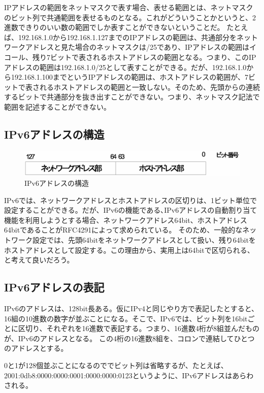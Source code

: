 IPアドレスの範囲をネットマスクで表す場合、表せる範囲とは、ネットマスクのビット列で共通範囲を表せるものとなる。これがどういうことかというと、2進数できりのいい数の範囲でしか表すことができないということだ。
たとえば、192.168.1.0から192.168.1.127までのIPアドレスの範囲は、共通部分をネットワークアドレスと見た場合のネットマスクは/25であり、IPアドレスの範囲はイコール、残り7ビットで表されるホストアドレスの範囲となる。つまり、このIPアドレスの範囲は192.168.1.0/25として表すことができる。だが、192.168.1.0から192.168.1.100までというIPアドレスの範囲は、ホストアドレスの範囲が、7ビットで表されるホストアドレスの範囲と一致しない。そのため、先頭からの連続するビットで共通部分を抜き出すことができない。つまり、ネットマスク記法で範囲を記述することができない。

\subsection{IPv6アドレスの構造}

\begin{figure}[htbp]
	\includegraphics[width=12cm,clip]{draw/ip6addr.eps}
	\caption{IPv6アドレスの構造}
	\label{fig:ipaddr}
\end{figure}


IPv6では、ネットワークアドレスとホストアドレスの区切りは、1ビット単位で設定することができる。だが、IPv6の機能である､IPv6アドレスの自動割り当て機能を利用しようとする場合、ネットワークアドレス64bit、ホストアドレス64bitであることがRFC4291によって求められている。
そのため、一般的なネットワーク設定では、先頭64bitをネットワークアドレスとして扱い、残り64bitをホストアドレスとして設定する。この理由から、実用上は64bitで区切られる、と考えて良いだろう。

\subsection{IPv6アドレスの表記}
IPv6のアドレスは、128bit長ある。仮にIPv4と同じやり方で表記したとすると、16組の10進数の数字が並ぶことになる。そこで、IPv6では、ビット列を16bitごとに区切り、それぞれを16進数で表記する。つまり、16進数4桁が8組並んだものが、IPv6のアドレスとなる。
この4桁の16進数8組を、コロンで連結してひとつのアドレスとする。

0と1が128個並ぶことになるのででビット列は省略するが、たとえば、2001:0db8:0000:0000:0001:0000:0000:0123というように、IPv6アドレスはあらわされる。


